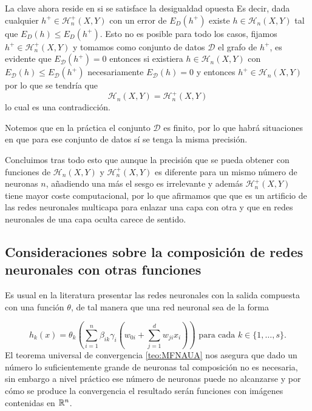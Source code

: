  La clave ahora reside en si se satisface la desigualdad opuesta
Es decir, dada cualquier $h^+ \in \mathcal{H}^+_n(X,Y)$ con un error de $E_D(h^+)$ existe $h \in \mathcal{H}_n(X,Y)$  tal que $E_D(h) \leq E_D(h^+).$  
Esto no es posible para todo los casos, fijamos $h^+ \in \mathcal{H}^+_n(X,Y)$ y tomamos como conjunto de datos $\mathcal{D}$ el grafo de $h^+$, es evidente que $E_{\mathcal{D}}(h^+) = 0$ entonces si existiera $h \in \mathcal{H}_n(X,Y)$ con $E_{\mathcal{D}}(h) \leq E_{\mathcal{D}}(h^+)$ necesariamente $E_{\mathcal{D}}(h) = 0$ y entonces $h^+ \in \mathcal{H}_n(X,Y)$ por lo que se tendría que 
$$\mathcal{H}_n(X,Y) = \mathcal{H}_n^+(X,Y)$$ 
lo cual es una contradicción.

Notemos que en la práctica el conjunto $\mathcal{D}$ es finito, 
por lo que habrá situaciones en que para ese conjunto de datos sí  se tenga la misma precisión. 


 Concluimos tras todo esto que aunque la precisión que se pueda obtener con funciones de $\mathcal{H}_n(X,Y)$ y $\mathcal{H}^+_n(X,Y)$ es diferente para un mismo número de neuronas $n$, añadiendo una más el sesgo es irrelevante  y además $\mathcal{H}^+_n(X,Y)$ tiene mayor coste computacional, por lo que afirmamos que 
que es un artificio de las redes neuronales multicapa para enlazar una capa con otra y que en redes neuronales de una capa oculta carece de sentido.

\subsection{Consideraciones sobre la composición de redes neuronales con otras funciones}

Es usual en la literatura presentar las redes neuronales con la salida compuesta con una función $\theta$, de tal manera que una red neuronal sea de la forma

\begin{equation}
    h_k(x) = \theta_k 
    \left(
        \sum_{i=1}^{n} \beta_{i k} \gamma_{i}
    \left(
        w_{0 i} + \sum_{j=1}^d w_{j i } x_i
    \right) 
    \right)
    \text{ para cada  } k \in \{1, \ldots, s \}.
\end{equation}
El teorema universal de convergencia \ref{teo:MFNAUA} nos asegura 
que dado un número lo suficientemente grande de neuronas tal 
composición no es necesaria, sin embargo a nivel práctico ese 
número de neuronas puede no alcanzarse y por cómo se produce la convergencia el resultado serán funciones con imágenes contenidas en $\mathbb{R}^n$.

